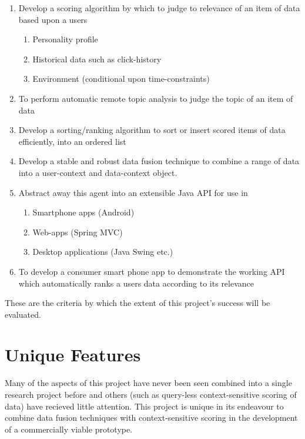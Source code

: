 \begin{enumerate}
	\item Develop a scoring algorithm by which to judge to relevance of an item of data based upon a users
	\begin{enumerate}
		\item Personality profile
		\item Historical data such as click-history
		\item Environment (conditional upon time-constraints)
	\end{enumerate}
	\item To perform automatic remote topic analysis to judge the topic of an item of data
	\item Develop a sorting/ranking algorithm to sort or insert scored items of data efficiently, into an ordered list
	\item Develop a stable and robust data fusion technique to combine a range of data into a user-context and data-context object.
	\item Abstract away this agent into an extensible Java API for use in
	\begin{enumerate}
		\item Smartphone apps (Android)
		\item Web-apps (Spring MVC)
		\item Desktop applications (Java Swing etc.)
	\end{enumerate}
	\item To develop a consumer smart phone app to demonstrate the working API which automatically ranks a users data according to its relevance
\end{enumerate}

These are the criteria by which the extent of this project's success will be evaluated.

\section{Unique Features}

Many of the aspects of this project have never been seen combined into a single research project before and others (such as query-less context-sensitive scoring of data) have recieved little attention. This project is unique in its endeavour to combine data fusion techniques with context-sensitive scoring in the development of a commercially viable prototype. 

